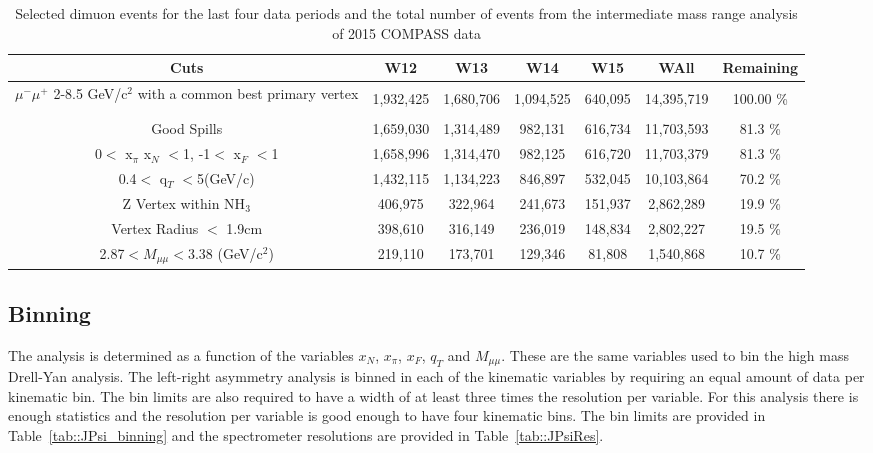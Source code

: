 \begin{table}[h!t]
  \begin{tabular}{ |c|c|c|c|c|c|c| }
    \hline \textbf{Cuts}& \textbf{W12}& \textbf{W13}& \textbf{W14}&
    \textbf{W15} & \textbf{WAll} & \textbf{Remaining} \\ \hline

    \multirow{3}{9em}{$\mu^-\mu^+$ 2-8.5 GeV/c$^2$ with a common best primary
      vertex}& & & & & & \\
    &1,932,425& 1,680,706& 1,094,525& 640,095& 14,395,719&
    100.00 \% \\ & & & & & & \\ \hline

    Good Spills& 1,659,030& 1,314,489& 982,131& 616,734& 11,703,593&
    81.3 \% \\ \hline

    0$<$ x$_{\pi}$ x$_N$ $<$1, -1$<$ x$_F$ $<$1&
    1,658,996& 1,314,470& 982,125& 616,720& 11,703,379&	81.3 \% \\ \hline

    0.4$<$ q$_T$ $<$5(GeV/c)&
    1,432,115& 1,134,223& 846,897& 532,045& 10,103,864&	70.2 \% \\ \hline

    Z Vertex within NH$_3$&
    406,975& 322,964& 241,673& 151,937&	2,862,289& 19.9  \% \\ \hline

    Vertex Radius $<$ 1.9cm&
    398,610& 316,149& 236,019& 148,834& 2,802,227& 19.5  \% \\ \hline

    2.87$< M_{\mu\mu} <$3.38 (GeV/c$^2$)&
    219,110& 173,701& 129,346& 81,808& 1,540,868& 10.7  \% \\ \hline
    
  \end{tabular}
  \caption{Selected dimuon events for the last four data periods and the total
    number of events from the intermediate mass range analysis of 2015 COMPASS
    data}
  \label{tab::JPsiStats2}
\end{table}


\subsection{Binning}

The analysis is determined as a function of the variables $x_N$, $x_{\pi}$,
$x_F$, $q_T$ and $M_{\mu\mu}$.  These are the same variables used to bin the
high mass Drell-Yan analysis.  The left-right asymmetry analysis is binned in
each of the kinematic variables by requiring an equal amount of data per
kinematic bin.  The bin limits are also required to have a width of at least
three times the resolution per variable.  For this analysis there is enough
statistics and the resolution per variable is good enough to have four kinematic
bins.  The bin limits are provided in Table~\ref{tab::JPsi_binning} and the
spectrometer resolutions are provided in Table~\ref{tab::JPsiRes}.

